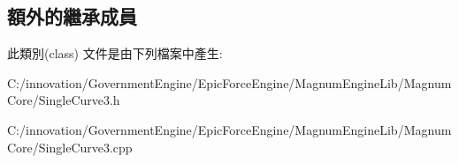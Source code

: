 \subsection*{額外的繼承成員}


此類別(class) 文件是由下列檔案中產生\+:\begin{DoxyCompactItemize}
\item 
C\+:/innovation/\+Government\+Engine/\+Epic\+Force\+Engine/\+Magnum\+Engine\+Lib/\+Magnum\+Core/Single\+Curve3.\+h\item 
C\+:/innovation/\+Government\+Engine/\+Epic\+Force\+Engine/\+Magnum\+Engine\+Lib/\+Magnum\+Core/Single\+Curve3.\+cpp\end{DoxyCompactItemize}
